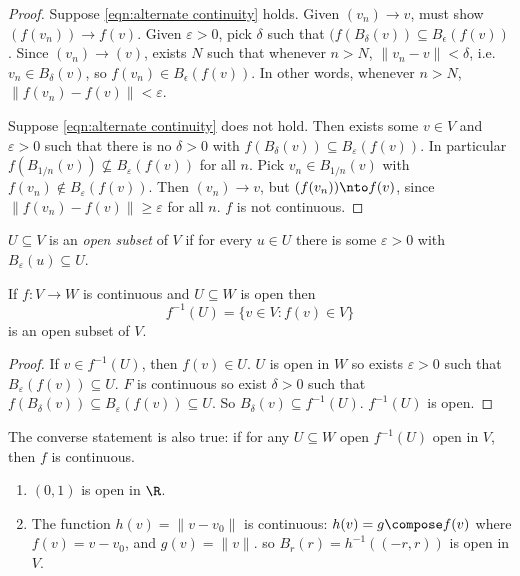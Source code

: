 \documentclass[a4paper]{article}
\theoremstyle{definition}
\begin{document}
\begin{proof}
  Suppose \eqref{eqn:alternate continuity} holds. Given $(v_n)\to v$, must show $(f(v_n))\to f(v)$. Given $\varepsilon>0$, pick $\delta$ such that $(f(B_\delta(v))\subseteq B_\epsilon(f(v))$. Since $(v_n)\to (v)$, exists $N$ such that whenever $n>N$, $\|v_n - v\| < \delta$, i.e. $v_n \in B_\delta(v)$, so $f(v_n) \in B_\epsilon(f(v))$. In other words, whenever $n>N$, $\|f(v_n)-f(v)\| <\varepsilon$.

  Suppose \eqref{eqn:alternate continuity} does not hold. Then exists some $v \in V$ and $\varepsilon>0$ such that there is no $\delta>0$ with $f(B_\delta(v)) \subseteq B_\varepsilon(f(v))$. In particular $f(B_{1/n}(v)) \nsubseteq B_\varepsilon(f(v))$ for all $n$. Pick $v_n \in B_{1/n}(v)$ with $f(v_n) \notin B_\varepsilon(f(v))$. Then $(v_n)\to v$, but $(f(v_n)) \nto f(v)$, since $\|f(v_n) - f(v) \| \geq \varepsilon$ for all $n$. $f$ is not continuous.
\end{proof}

\begin{defi}
  $U \subseteq V$ is an \emph{open subset} of $V$ if for every $u \in U$ there is some $\varepsilon>0$ with $B_\varepsilon(u) \subseteq U$.
\end{defi}

\begin{prop}
  If $f:V\to W$ is continuous and $U\subseteq W$ is open then
  \[
    f^{-1}(U) = \{v \in V: f(v) \in V\}
  \]
  is an open subset of $V$.
\end{prop}

\begin{proof}
  If $v\in f^{-1}(U)$, then $f(v) \in U$. $U$ is open in $W$ so exists $\varepsilon>0$ such that $B_\varepsilon(f(v)) \subseteq U$. $F$ is continuous so exist $\delta>0$ such that $f(B_\delta(v)) \subseteq B_\varepsilon(f(v)) \subseteq U$. So $B_\delta(v) \subseteq f^{-1}(U)$. $f^{-1}(U)$ is open.
\end{proof}

\begin{rmk}
  The converse statement is also true: if for any $U \subseteq W$ open $f^{-1}(U)$ open in $V$, then $f$ is continuous.
\end{rmk}

\begin{eg}\leavevmode
  \begin{enumerate}
  \item $(0,1)$ is open in $\R$.
    \item The function $h(v) = \|v-v_0\|$ is continuous: $h(v) = g \compose f(v)$ where $f(v) = v-v_0$, and $g(v)=\|v\|$. so $B_r(r) = h^{-1}((-r,r))$ is open in $V$.
  \end{enumerate}
\end{eg}
\end{document}
